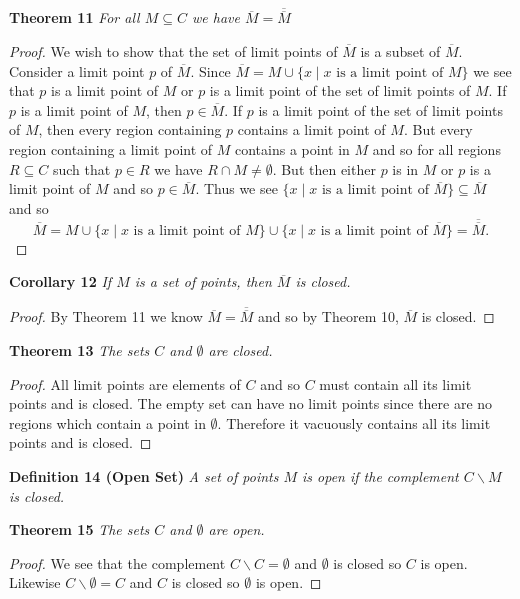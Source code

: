 \documentclass{article}
\begin{document}
\begin{flushleft}
\textbf{Theorem 11}
\textsl{For all $M \subseteq C$ we have $\overline{M} = \overline{\overline{M}}$}
\begin{proof}
We wish to show that the set of limit points of $\overline{M}$ is a subset of $\overline{M}$. Consider a limit point $p$ of $\overline{M}$. Since $\overline{M} = M \cup \{x \mid x \text{ is a limit point of }M\}$ we see that $p$ is a limit point of $M$ or $p$ is a limit point of the set of limit points of $M$. If $p$ is a limit point of $M$, then $p \in \overline{M}$. If $p$ is a limit point of the set of limit points of $M$, then every region containing $p$ contains a limit point of $M$. But every region containing a limit point of $M$ contains a point in $M$ and so for all regions $R \subseteq C$ such that $p \in R$ we have $R \cap M \neq \emptyset$. But then either $p$ is in $M$ or $p$ is a limit point of $M$ and so $p \in \overline{M}$. Thus we see $\{x \mid x \text{ is a limit point of } \overline{M}\} \subseteq \overline{M}$ and so
\[
\overline{M} = M \cup \{x \mid x \text{ is a limit point of }M\} \cup \{x \mid x \text{ is a limit point of }\overline{M}\} = \overline{\overline{M}}.
\]
\end{proof}

\textbf{Corollary 12}
\textsl{If $M$ is a set of points, then $\overline{M}$ is closed.}
\begin{proof}
By Theorem 11 we know $\overline{M} = \overline{\overline{M}}$ and so by Theorem 10, $\overline{M}$ is closed.
\end{proof}

\textbf{Theorem 13}
\textsl{The sets $C$ and $\emptyset$ are closed.}
\begin{proof}
All limit points are elements of $C$ and so $C$ must contain all its limit points and is closed. The empty set can have no limit points since there are no regions which contain a point in $\emptyset$. Therefore it vacuously contains all its limit points and is closed.
\end{proof}

\textbf{Definition 14 (Open Set)}
\textsl{A set of points $M$ is open if the complement $C \backslash M$ is closed.}\newline

\textbf{Theorem 15}
\textsl{The sets $C$ and $\emptyset$ are open.}
\begin{proof}
We see that the complement $C \backslash C = \emptyset$ and $\emptyset$ is closed so $C$ is open. Likewise $C \backslash \emptyset = C$ and $C$ is closed so $\emptyset$ is open.
\end{proof}


\end{flushleft}
\end{document}
